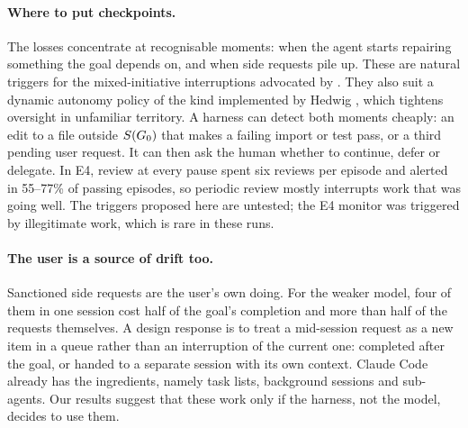 \paragraph{Where to put checkpoints.} The losses concentrate at recognisable moments: when the agent
starts repairing something the goal depends on, and when side requests pile up. These are natural
triggers for the mixed-initiative interruptions advocated by \citet{bui2026proactivity}
\citep[see also][]{horvitz1999mixed}. They also suit a dynamic autonomy policy of the kind
implemented by Hedwig \citep{shukla2026hedwig}, which tightens oversight in unfamiliar territory. A
harness can detect both moments cheaply: an edit to a file outside $S(G_0)$ that makes a failing
import or test pass, or a third pending user request. It can then ask the human whether to continue,
defer or delegate. In E4, review at every pause spent six reviews per episode and alerted in 55--77\% of
passing episodes, so periodic review mostly interrupts work that was going well. The triggers
proposed here are untested; the E4 monitor was triggered by illegitimate work, which is rare in
these runs.

\paragraph{The user is a source of drift too.} Sanctioned side requests are the user's own doing.
For the weaker model, four of them in one session cost half of the goal's completion and more than
half of the requests themselves. A design response is to treat a mid-session request as a new item
in a queue rather than an interruption of the current one: completed after the goal, or handed to a
separate session with its own context. Claude Code already has the ingredients, namely task lists,
background sessions and sub-agents. Our results suggest that these work only if the harness, not the
model, decides to use them.

